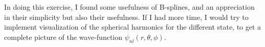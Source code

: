 \documentclass[a4paper]{article}
\newcommand{\newparagraph}{\vspace{.5cm}\noindent}
\begin{document}
\newparagraph
In doing this exercise, I found some usefulness of B-splines, and an appreciation in their simplicity but also their usefulness.
If I had more time, I would try to implement visualization of the spherical harmonics for the different state, to get a complete picture of the wave-function $\psi_{nl}(r,\theta, \phi)$.

\end{document}
